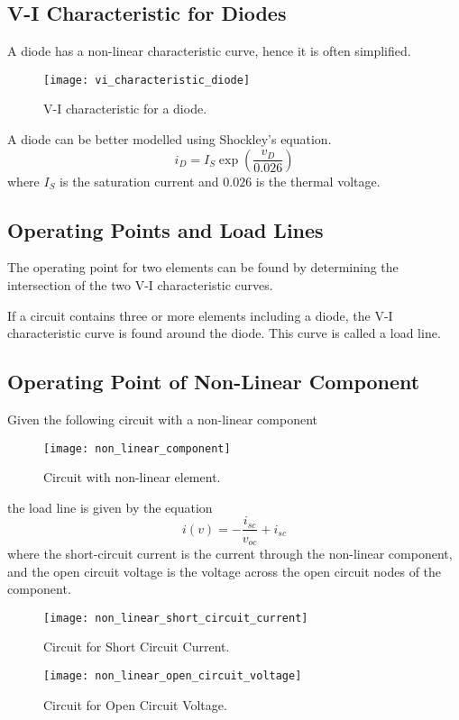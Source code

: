 \documentclass{article}
\begin{document}
\subsection{V-I Characteristic for Diodes}
A diode has a non-linear characteristic curve, hence it is often simplified.
\begin{figure}[H]
    \centering
    \texttt{[image: vi\_characteristic\_diode]}
    \caption{V-I characteristic for a diode.}
\end{figure}
\begin{theorem}
    A diode can be better modelled using Shockley's equation.
    \begin{equation*}
        i_D = I_S \exp{\left( \frac{v_D}{0.026} \right)}
    \end{equation*}
    where $I_S$ is the saturation current and $0.026$ is the thermal voltage. 
\end{theorem}
\subsection{Operating Points and Load Lines}
\begin{definition}
    The operating point for two elements can be found by determining the intersection 
    of the two V-I characteristic curves.
\end{definition}
\begin{definition}
    If a circuit contains three or more elements including a diode, the V-I characteristic curve
    is found around the diode. This curve is called a load line.
\end{definition}
\subsection{Operating Point of Non-Linear Component}
Given the following circuit with a non-linear component
\begin{figure}[H]
    \centering
    \texttt{[image: non\_linear\_component]}
    \caption{Circuit with non-linear element.}
\end{figure}
the load line is given by the equation
\begin{equation*}
    i(v) = -\frac{i_{sc}}{v_{oc}} + i_{sc}
\end{equation*}
where the short-circuit current is the current through the non-linear component, and the open circuit voltage is the voltage across the 
open circuit nodes of the component.
\begin{figure}[H]
    \centering
    \texttt{[image: non\_linear\_short\_circuit\_current]}
    \caption{Circuit for Short Circuit Current.}
\end{figure}
\begin{figure}[H]
    \centering
    \texttt{[image: non\_linear\_open\_circuit\_voltage]}
    \caption{Circuit for Open Circuit Voltage.}
\end{figure}
\newpage
\end{document}
